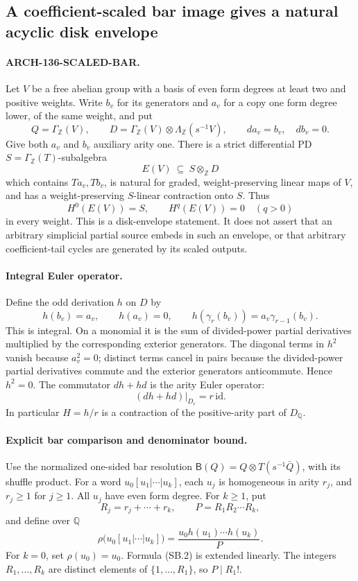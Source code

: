 \subsection{A coefficient-scaled bar image gives a natural acyclic disk envelope}
\label{arch136:scaled-bar}

\paragraph{ARCH-136-SCALED-BAR.}
Let \(V\) be a free abelian group with a basis of even form degrees at
least two and positive weights. Write \(b_v\) for its generators and
\(a_v\) for a copy one form degree lower, of the same weight, and put
\[
 Q=\Gamma_{\mathbb Z}(V),\qquad
 D=\Gamma_{\mathbb Z}(V)\otimes
       \Lambda_{\mathbb Z}(s^{-1}V),\qquad
 d a_v=b_v,\quad d b_v=0.
\]
Give both \(a_v\) and \(b_v\) auxiliary arity one.
There is a strict differential PD \(S=\Gamma_{\mathbb Z}(T)\)-subalgebra
\[
 E(V)\ \subseteq\ S\otimes_{\mathbb Z}D
\]
which contains \(T a_v,T b_v\), is natural for graded,
weight-preserving linear maps of \(V\), and has a weight-preserving
\(S\)-linear contraction onto \(S\). Thus
\[
 H^0(E(V))=S,\qquad H^q(E(V))=0\quad(q>0)
\]
in every weight. This is a disk-envelope statement. It does not assert
that an arbitrary simplicial partial source embeds in such an envelope,
or that arbitrary coefficient-tail cycles are generated by its scaled
outputs.

\paragraph{Integral Euler operator.}
Define the odd derivation \(h\) on \(D\) by
\[
 h(b_v)=a_v,\qquad h(a_v)=0,\qquad
 h(\gamma_r(b_v))=a_v\gamma_{r-1}(b_v).
\]
This is integral. On a monomial it is the sum of divided-power partial
derivatives multiplied by the corresponding exterior generators.
The diagonal terms in \(h^2\) vanish because \(a_v^2=0\); distinct
terms cancel in pairs because the divided-power partial derivatives
commute and the exterior generators anticommute. Hence \(h^2=0\).
The commutator \(dh+hd\) is the arity Euler operator:
\[
 (dh+hd)|_{D_r}=r\,\mathrm{id}.
 \tag{SB.1}
\]
In particular \(H=h/r\) is a contraction of the positive-arity part
of \(D_{\mathbb Q}\).

\paragraph{Explicit bar comparison and denominator bound.}
Use the normalized one-sided bar resolution
\(\mathsf B(Q)=Q\otimes T(s^{-1}\bar Q)\), with its shuffle product.
For a word \(u_0[u_1|\cdots|u_k]\), each \(u_j\) is homogeneous in
arity \(r_j\), and \(r_j\ge1\) for \(j\ge1\).
All \(u_j\) have even form degree. For \(k\ge1\), put
\[
 R_j=r_j+\cdots+r_k,\qquad P=R_1R_2\cdots R_k,
\]
and define over \(\mathbb Q\)
\[
 \rho\bigl(u_0[u_1|\cdots|u_k]\bigr)
   =\frac{u_0h(u_1)\cdots h(u_k)}{P}.
 \tag{SB.2}
\]
For \(k=0\), set \(\rho(u_0)=u_0\). Formula (SB.2) is extended
linearly. The integers \(R_1,\ldots,R_k\) are distinct elements of
\(\{1,\ldots,R_1\}\), so \(P\mid R_1!\).


